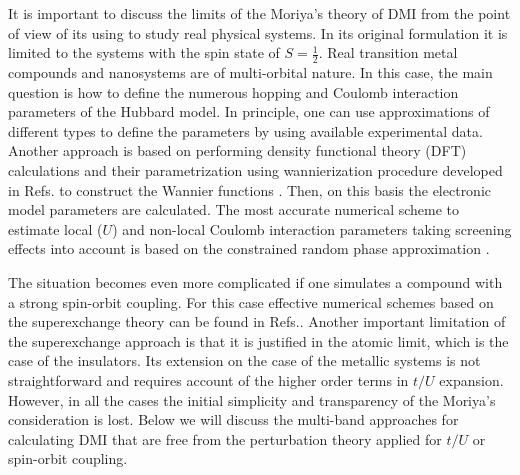 \documentclass[aps,prl,twocolumn,showpacs,amsmath,amssymb]{revtex4-1}
\begin{document}
It is important to discuss the limits of the Moriya's theory of DMI from the point of view of its using to study real physical systems. In its original formulation it is limited to the systems with the spin state of $S = \frac{1}{2}$.  Real transition metal compounds and nanosystems are of multi-orbital nature. 
In this case, the main question is how to define the numerous hopping and Coulomb interaction parameters of the Hubbard model. 
In principle, one can use approximations of different types to define the parameters \cite{Moskvin1, Moskvin2} by using available experimental data.  Another approach is based on performing density functional theory (DFT) calculations and their parametrization using wannierization procedure developed in Refs.\cite{Wannier1,Wannier2} to construct the Wannier functions \cite{Wannier90}. Then, on this basis the electronic model parameters are calculated. The most accurate numerical scheme to estimate local ($U$) and non-local Coulomb interaction parameters taking screening effects into account is based on the constrained random phase approximation \cite{CRPA}.

The situation becomes even more complicated if one simulates a compound with a strong spin-orbit coupling. For this case effective numerical schemes based on the superexchange theory can be found in Refs.\cite{Solovyev1,Solovyev2}.  Another important limitation of the superexchange approach is that it is justified in the atomic limit, which is the case of the insulators. Its extension on the case of the metallic systems is not straightforward and requires account of the higher order terms in $t/U$ expansion. However, in all the cases the initial simplicity and transparency of the Moriya's consideration is lost. Below we will discuss the multi-band approaches for calculating DMI that are free from the perturbation theory applied for $t/U$ or spin-orbit coupling.

\end{document}
